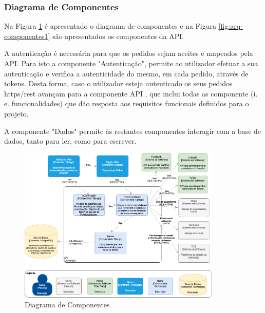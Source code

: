 \subsubsection{Diagrama de Componentes}

Na Figura \ref{fig:arq-componentes} é apresentado o diagrama de componentes e na Figura \ref{fig:arq-componentes1} são apresentados os componentes da API. 

A autenticação é necessária para que os pedidos sejam aceites e mapeados pela API. Para isto a componente "Autenticação", permite ao utilizador efetuar a sua autenticação e verifica a autenticidade do mesmo, em cada pedido, através de tokens. Desta forma, caso o utilizador esteja autenticado os seus pedidos \acrshort{https}/\acrshort{rest} avançam para a componente API , que inclui todas as componente (i. e. funcionalidades) que dão resposta aos requisitos funcionais definidos para o projeto.

A componente "Dados" permite às restantes componentes interagir com a base de dados, tanto para ler, como para escrever.


\begin{figure}[ht!]
	\begin{center}
		\includegraphics[width=0.86\textwidth]{img/arq/diagrama-componentes}
		\caption{Diagrama de Componentes}
		\label{fig:arq-componentes}
	\end{center}
\end{figure}

